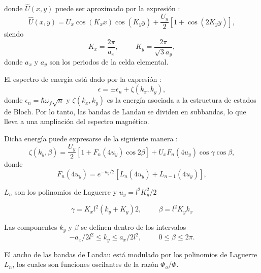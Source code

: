 \begin{frame}
	donde $\hat{U}(x,y)$ puede ser aproximado por la expresión \cite{Wang2004}:
	\begin{equation}
			\hat{U}(x,y)=U_{x}\cos (K_{x}x)\cos (K_{y}y)+\frac{U_{y}}{2}\left[ 1+\cos (2K_{y}y)\right],
	\end{equation}
	siendo
	\begin{equation}
		K_{x}=\frac{2\pi}{a_{x}},\hspace{1cm}K_{y}=\frac{2\pi}{\sqrt{3}a_{y}},
	\end{equation}
	donde $a_x$ y $a_y$ son los periodos de la celda elemental.
\end{frame}

\begin{frame}
	El espectro de energía está dado por la expresión \cite{Wang2004}:
	\begin{equation}
			\epsilon = \pm \epsilon_n + \zeta(k_x,k_y),
	\end{equation}
	donde $\epsilon_n = \hbar\omega_f\sqrt n $ y
	$\zeta(k_x,k_y)$ es la energía asociada a la estructura de estados de Bloch.
	Por lo tanto, las bandas de Landau se dividen en subbandas,
	lo que lleva a una ampliación del espectro magnético.
\end{frame}

\begin{frame}
	Dicha energía puede expresarse de la siguiente manera \cite{Wang2004}:
	\begin{equation}
			\zeta(k_{y}, \beta)=\frac{U_{y}}{2}\left[1+F_{n}(4u_{y})\cos 2\beta\right]+U_{x}F_{n}(4u_{y})\cos \gamma\cos \beta,
	\end{equation}
	donde
	\begin{equation}
		F_{n} (4u_{y}) = e^{- u_{y} / 2} \left[L_{n} (4u_{y}) + L_{n-1} (4u_{y}) \right],
	\end{equation}

	$L_n$ son los polinomios de Laguerre y $ u_{y} = l^{2} K_{y}^{2} / 2 $
\end{frame}

\begin{frame}
	\begin{equation}
		\gamma = K_{x} l^{2} (k_{y} + K_{y}) 2,\hspace{1cm} \beta = l^{2} K_{y} k_{x }
	\end{equation}

	Las componentes $ k_{y} $ y $ \beta $ se definen dentro de los intervalos
	\begin{equation}
	-a_{x} / 2l^{2} \leq k_{y} \leq a_{x} / 2l^{ 2},\hspace{1cm}0 \leq \beta \leq 2 \pi.                                                                               \end{equation}

  El ancho de las bandas de Landau está modulado por los polinomios de Laguerre $L_n$,
	los cuales son funciones oscilantes de la razón $\Phi_o/\Phi$.
\end{frame}
